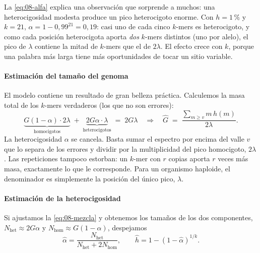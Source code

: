La \cref{eq:08-alfa} explica una observación que sorprende a muchos: una heterocigosidad modesta produce un pico heterocigoto enorme. Con $h=1\,\%$ y $k=21$, $\alpha=1-0{,}99^{21}=0{,}19$: casi uno de cada cinco $k$-mers es heterocigoto, y como cada posición heterocigota aporta \emph{dos} $k$-mers distintos (uno por alelo), el pico de $\lambda$ contiene la mitad de $k$-mers que el de $2\lambda$. El efecto crece con $k$, porque una palabra más larga tiene más oportunidades de tocar un sitio variable.

\paragraph{Estimación del tamaño del genoma} El modelo contiene un resultado de gran belleza práctica. Calculemos la masa total de los $k$-mers verdaderos (los que no son errores):
\begin{equation}\label{eq:08-masa}
\underbrace{G(1-\alpha)\cdot 2\lambda}_{\text{homocigotos}} \;+\; \underbrace{2G\alpha\cdot\lambda}_{\text{heterocigotos}} \;=\; 2G\lambda
\quad\Longrightarrow\quad
\widehat{G} \;=\; \frac{\sum_{m\ge v} m\,h(m)}{2\lambda}.
\end{equation}
La heterocigosidad $\alpha$ se cancela. Basta sumar el espectro por encima del valle $v$ que lo separa de los errores y dividir por la multiplicidad del pico homocigoto, $2\lambda$. Las repeticiones tampoco estorban: un $k$-mer con $r$ copias aporta $r$ veces más masa, exactamente lo que le corresponde. Para un organismo haploide, el denominador es simplemente la posición del único pico, $\lambda$.

\paragraph{Estimación de la heterocigosidad} Si ajustamos la \cref{eq:08-mezcla} y obtenemos los tamaños de los dos componentes, $N_{\text{het}}\approx 2G\alpha$ y $N_{\text{hom}}\approx G(1-\alpha)$, despejamos
\begin{equation}\label{eq:08-het}
\widehat{\alpha} = \frac{N_{\text{het}}}{N_{\text{het}} + 2N_{\text{hom}}},
\qquad
\widehat{h} = 1-(1-\widehat{\alpha})^{1/k}.
\end{equation}

\begin{simbolos}
\end{simbolos}

